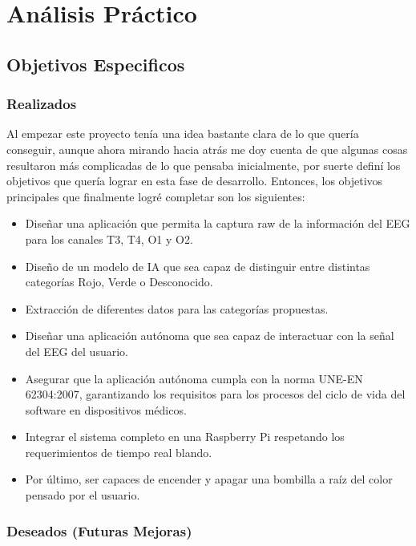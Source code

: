 \chapter{Análisis Práctico}\label{ch:practical_analytics}

\section{Objetivos Especificos}
\subsection{Realizados}

Al empezar este proyecto tenía una idea bastante clara de lo que quería conseguir, aunque ahora mirando hacia atrás me doy cuenta de que algunas cosas resultaron más complicadas de lo que pensaba inicialmente, por suerte definí los objetivos que quería lograr en esta fase de desarrollo. Entonces, los objetivos principales que finalmente logré completar son los siguientes:

\begin{itemize}
    \item Diseñar una aplicación que permita la captura raw de la información del EEG para los canales T3, T4, O1 y O2.
    \item Diseño de un modelo de IA que sea capaz de distinguir entre distintas categorías Rojo, Verde o Desconocido.
    \item Extracción de diferentes datos para las categorías propuestas.
    \item Diseñar una aplicación autónoma que sea capaz de interactuar con la señal del EEG del usuario.
    \item Asegurar que la aplicación autónoma cumpla con la norma UNE-EN 62304:2007, garantizando los requisitos para los procesos del ciclo de vida del software en dispositivos médicos.
    \item Integrar el sistema completo en una Raspberry Pi respetando los requerimientos de tiempo real blando.
    \item Por último, ser capaces de encender y apagar una bombilla a raíz del color pensado por el usuario.
\end{itemize}

\newpage

\subsection{Deseados (Futuras Mejoras)}

